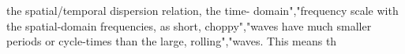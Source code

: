 {{{{{{{{{{the spatial/temporal dispersion relation, the time- domain","frequency scale with the spatial-domain frequencies, as short, choppy","waves have much smaller periods or cycle-times than the large, rolling","waves. This means th}}}}}}}}}}
